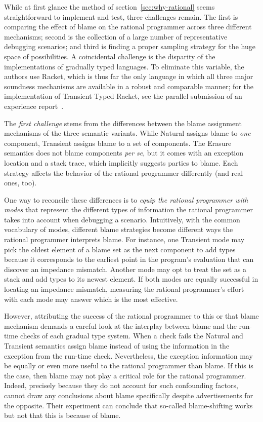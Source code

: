 
While at first glance the method of section~\ref{sec:why-rational} seems straightforward to implement and test,
three challenges remain. The first is comparing the effect of blame on the rational
programmer across three different mechanisms; second is the collection of a large number
of representative debugging scenarios; and third is finding a proper sampling strategy for the
huge space of possibilities. A coincidental challenge is the disparity of the
implementations of gradually typed languages. To eliminate this variable, the
authors use Racket, which is thus far the only language in which all three major
soundness mechanisms are available in a robust and comparable manner;
for the implementation of Transient Typed Racket, see the parallel submission
of an experience report~\cite{ttt21}.

The {\em first challenge\/} stems from the differences between the blame
assignment mechanisms of the three semantic variants.  While Natural assigns
blame to {\em one\/} component, Transient assigns blame to a set of
components. The Erasure semantics does not blame components {\it per se\/}, but
it comes with an exception location and a stack trace, which implicitly suggests
parties to blame.  Each strategy affects the behavior of the rational programmer
differently (and real ones, too).

One way to reconcile these differences is to {\em equip the rational
programmer with modes \/} that represent the different types of
information the rational programmer takes into account when debugging a
scenario. Intuitively, with the common vocabulary of modes, different
blame strategies become different ways the rational programmer  interprets
blame.  For instance, one Transient mode may pick the oldest element of a
blame set as the next component to add types because it corresponds to the
earliest point in the program's evaluation that can discover an impedance
mismatch.  Another mode may opt to treat the set as a stack and add
types to its newest element.  If both modes are equally successful in
locating an impedance mismatch, measuring the rational programmer's effort with each mode
may answer which is the most effective.


However, attributing the success of the rational programmer to this or
that blame mechanism demands a careful look at the interplay between blame
and the run-time checks of each gradual type system. When a check fails
the Natural and Transient semantics assign blame instead of using the
information in the exception from the run-time check. Nevertheless, the
exception information may be equally or even more useful to the rational
programmer than blame. If this is the case, then blame may not play a critical
role for the rational programmer. Indeed, precisely because they do not
account for such confounding factors, \citet{lksfd-popl-2020} cannot draw any
conclusions about blame specifically despite advertisements for the
opposite. Their experiment can conclude that so-called blame-shifting
works but not that this is because of blame. 

